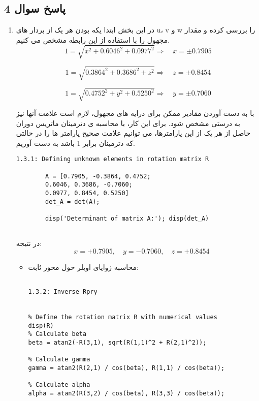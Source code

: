 \subsection{ پاسخ سوال 4}
\begin{enumerate}
	\item 
در این بخش ابتدا یکه بودن هر یک از بردار های u، v و w را بررسی کرده و مقدار مجهول را با استفاده از این رابطه مشخص می کنیم.
\[
1 = \sqrt{x^2 + 0.6046^2 + 0.0977^2} 
\Rightarrow \quad x = \pm0.7905
\]

\[
1 = \sqrt{0.3864^2 + 0.3686^2 + z^2} 
\Rightarrow \quad z = \pm0.8454
\]

\[
1 = \sqrt{0.4752^2 + y^2 + 0.5250^2} 
\Rightarrow \quad y = \pm0.7060
\]

با به دست آوردن مقادیر ممکن برای درایه های مجهول، لازم است علامت آنها نیز به درستی مشخص شود. برای این کار، با محاسبه ی دترمینان ماتریس دوران حاصل از هر یک از این پارامترها، می توانیم علامت صحیح پارامتر ها را در حالتی که دترمینان برابر 1 باشد به دست آوریم. 
\begin{latin}
	\begin{lstlisting}[frame=single,style=Matlab-Pyglike]
		1.3.1: Defining unknown elements in rotation matrix R
		
		A = [0.7905, -0.3864, 0.4752; 
		0.6046, 0.3686, -0.7060; 
		0.0977, 0.8454, 0.5250]
		det_A = det(A);
		
		disp('Determinant of matrix A:'); disp(det_A)
		
	\end{lstlisting}
\end{latin}

در نتیجه:
\[
\quad x = +0.7905,
\quad y = -0.7060,
\quad z = +0.8454
\]

\begin{itemize}

 \item 
محاسبه زوایای اویلر حول محور ثابت:
\begin{latin}
	\begin{lstlisting}[frame=single,style=Matlab-Pyglike]
		
1.3.2: Inverse Rpry


% Define the rotation matrix R with numerical values
disp(R)
% Calculate beta
beta = atan2(-R(3,1), sqrt(R(1,1)^2 + R(2,1)^2));

% Calculate gamma
gamma = atan2(R(2,1) / cos(beta), R(1,1) / cos(beta));

% Calculate alpha
alpha = atan2(R(3,2) / cos(beta), R(3,3) / cos(beta));


\end{lstlisting}
\end{latin}
\end{itemize}
\end{enumerate}
